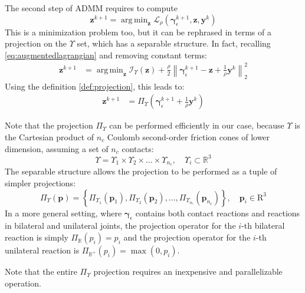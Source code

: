 \documentclass[AMA,STIX1COL]{WileyNJD-v2}
\newcommand{\vect}[1]{\bm{#1}}
\newcommand{\norm}[1]{\left\lVert#1\right\rVert}
\DeclareMathOperator*{\argmin}{arg\,min} %
\begin{document}
The second step of ADMM requires to compute 
\[
\vect{z}^{k+1} = \argmin_{\vect{z}} 
\mathcal{L}_{\rho} \left(\vect{\gamma}_\epsilon^{k+1},\vect{z},\vect{y}^k\right)
\] 
%
This is a minimization problem too, but it can be rephrased in terms of a projection on the $\Upsilon$ set, which has a separable structure.
In fact, recalling \eqref{eq:augmentedlagrangian} and removing constant terms: 
\begin{align}
\vect{z}^{k+1} &= \argmin_{\vect{z}}  
\mathcal{I}_\Upsilon(\vect{z}) 
+ \frac{\rho}{2} \norm{ \vect{\gamma}_\epsilon^{k+1} - \vect{z} + \frac{1}{\rho} \vect{y}^k}_2^2
\end{align}
%
Using the definition \ref{def:projection}, this leads to:
\begin{align}
\vect{z}^{k+1} &= \Pi_\Upsilon \left(  \vect{\gamma}_\epsilon^{k+1} +\frac{1}{\rho} \vect{y}^k \right )
\end{align}

Note that the projection $\Pi_\Upsilon$ can be performed efficiently in our case, because $\Upsilon$ is the Cartesian product of $n_c$ Coulomb second-order friction cones of lower dimension, assuming a set of $n_c$ contacts:
\[
\Upsilon = \Upsilon_1 \times \Upsilon_2 \times \ldots \times \Upsilon_{n_c}, \quad \Upsilon_i \subset \mathbb{R}^3
\]
The separable structure allows the projection to be performed as a tuple of simpler projections:
\[
\Pi_\Upsilon(\vect{p}) = \left\{ \Pi_{\Upsilon_1}(\vect{p}_1), \Pi_{\Upsilon_2}(\vect{p}_2), \ldots,  \Pi_{\Upsilon_{n_c}}(\vect{p}_{n_c}) \right\}, \quad \vect{p}_i \in \mathrm{R}^3
\]
%
In a more general setting, where $\vect{\gamma}_\epsilon$ contains both contact reactions and reactions in bilateral and unilateral joints, the projection operator for the $i$-th bilateral reaction is simply $\Pi_{\mathbb{R}}(p_i) = p_i$ and the projection operator for the $i$-th unilateral reaction is $\Pi_{\mathbb{R}^+}(p_i) = \max{(0,p_i)}$.

Note that the entire $\Pi_\Upsilon$ projection requires an inexpensive and parallelizable operation.
\end{document}
